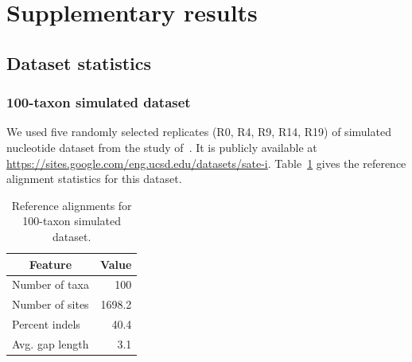 \section{Supplementary results}
\label{sec:result_balibase}

\subsection{Dataset statistics}
\label{sec:dataset_stat}
\subsubsection{100-taxon simulated dataset}
We used five randomly selected replicates (R0, R4, R9, R14, R19) of simulated nucleotide dataset from the study of~\citealp{liu2009rapid}. It is publicly available at \url{https://sites.google.com/eng.ucsd.edu/datasets/sate-i}. Table~\ref{tab:sim_stat} gives the reference alignment statistics for this dataset.

\begin{table}[htbp]
	\centering
	\caption{Reference alignments for 100-taxon simulated dataset.}
	\begin{tabular}{|l|r|}
		\hline
		\multicolumn{1}{|c|}{Feature} & \multicolumn{1}{c|}{Value} \\
		\hline
		Number of taxa & 100 \\
		\hline
		Number of sites & 1698.2 \\
		\hline
		Percent indels & 40.4 \\
		\hline
		Avg. gap length & 3.1 \\
		\hline
	\end{tabular}%
	\label{tab:sim_stat}%
\end{table}%


